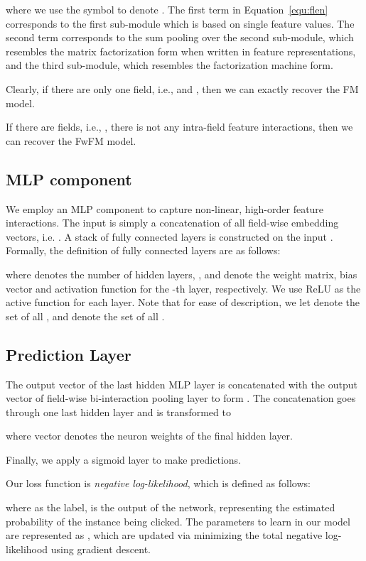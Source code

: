 \documentclass[sigconf]{acmart}
\begin{document}
where we use the symbol  to denote . The first term in Equation~\ref{equ:flen} corresponds to the first sub-module which is based on single feature values. The second term corresponds to the sum pooling over the second sub-module, which resembles the matrix factorization form when written in feature representations, and the third sub-module, which resembles the factorization machine form.  


Clearly, if there are only one field, i.e.,  and , then we can exactly recover the FM model.
   

If there are  fields, i.e., , there is not any intra-field feature interactions, then we can recover the FwFM model.
  







\subsection{MLP component}\label{sec:MLP}
We employ an MLP component to capture non-linear, high-order feature interactions. 
The input is simply a concatenation of all field-wise embedding vectors, i.e. . 
A stack of fully connected layers is constructed on the input . 
Formally, the definition of fully connected layers are as follows:

where  denotes the number of hidden layers, ,  and  denote the weight matrix, bias vector and activation function for the -th layer, respectively. We use ReLU as the active function for each layer. Note that for ease of description, we let  denote the set of all , and  denote the set of all .

\subsection{Prediction Layer}\label{sec:prediction}

The output vector of the last hidden MLP layer  is concatenated with the output vector of field-wise bi-interaction pooling layer  to form . 
The concatenation  goes through one last hidden layer and is transformed to 

where vector  denotes the neuron weights of the final hidden layer. 

Finally, we apply a sigmoid layer to make predictions. 


Our loss function is \textit{negative log-likelihood}, which is defined as follows:

where  as the label,  is the output of the network, representing the estimated probability of the instance  being clicked. The parameters to learn in our model are represented as , which are updated via minimizing the total negative log-likelihood using gradient descent.
\end{document}
